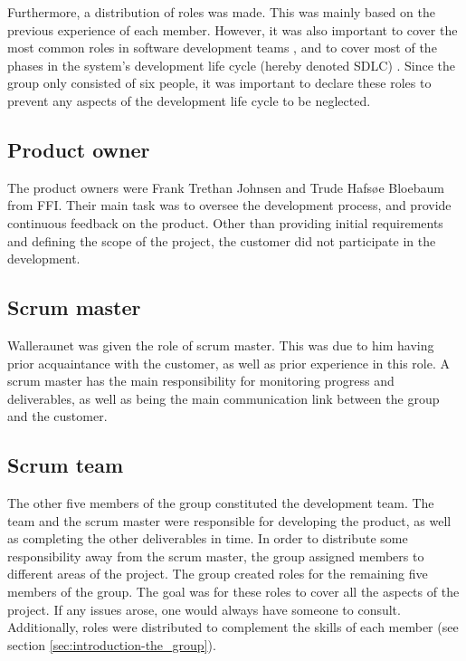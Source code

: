Furthermore, a distribution of roles was made. This was mainly based on the previous experience of each member. However, it was also important to cover the most common roles in software development teams \cite{software-roles}, and to cover most of the phases in the system's development life cycle (hereby denoted SDLC) \cite{sdlc}. Since the group only consisted of six people, it was important to declare these roles to prevent any aspects of the development life cycle to be neglected.

\subsection{Product owner}
\label{subsec:process_and_methodology-project_organization-product_owner}

The product owners were Frank Trethan Johnsen and Trude Hafsøe Bloebaum from FFI. Their main task was to oversee the development process, and provide continuous feedback on the product. Other than providing initial requirements and defining the scope of the project, the customer did not participate in the development.

\subsection{Scrum master}
\label{subsec:process_and_methodology-project_organization-scrum_master}

Walleraunet was given the role of scrum master. This was due to him having prior acquaintance with the customer, as well as prior experience in this role. A scrum master has the main responsibility for monitoring progress and deliverables, as well as being the main communication link between the group and the customer.

\subsection{Scrum team}
\label{subsec:process_and_methodology-project_organization-scrum_team}

The other five members of the group constituted the development team. The team and the scrum master were responsible for developing the product, as well as completing the other deliverables in time. In order to distribute some responsibility away from the scrum master, the group assigned members to different areas of the project. The group created roles for the remaining five members of the group. The goal was for these roles to cover all the aspects of the project. If any issues arose, one would always have someone to consult. Additionally, roles were distributed to complement the skills of each member (see section \ref{sec:introduction-the_group}).

